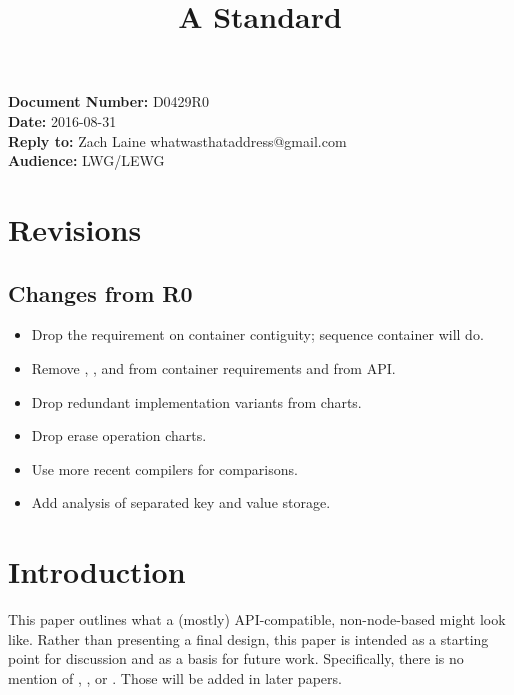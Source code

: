 \documentclass{article}
\begin{document}
\title{\textbf{\Large A Standard }}
\date{}
{\let\newpage\relax\maketitle}

\noindent\textbf{Document Number:} D0429R0\\
\textbf{Date:} 2016-08-31\\
\textbf{Reply to:} Zach Laine whatwasthataddress@gmail.com\\
\textbf{Audience:} LWG/LEWG

\section{Revisions}

\label{sec:revisions}

\subsection{Changes from R0}

\begin{itemize}
  \item Drop the requirement on container contiguity; sequence container will
    do.
  \item Remove , , and 
    from container requirements and from  API.
  \item Drop redundant implementation variants from charts.
  \item Drop erase operation charts.
  \item Use more recent compilers for comparisons.
  \item Add analysis of separated key and value storage.
\end{itemize}

\section{Introduction}

\label{sec:intro}

This paper outlines what a (mostly) API-compatible, non-node-based 
might look like.  Rather than presenting a final design, this paper is
intended as a starting point for discussion and as a basis for future work.
Specifically, there is no mention of , , or
.  Those will be added in later papers.



\end{document}
